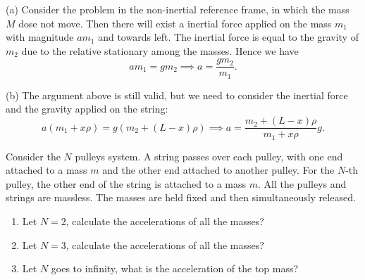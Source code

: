 \documentclass{article}
\begin{document}
\begin{solution}
	(a) Consider the problem in the non-inertial reference frame, in which the mass $M$ dose not move. Then there will exist a inertial force applied on the mass $m_1$ with magnitude $am_1$ and towards left. The inertial force is equal to the gravity of $m_2$ due to the relative stationary among the masses. Hence we have
	\[ am_1 = gm_2 \implies a = \frac{gm_2}{m_1}. \]

	(b) The argument above is still valid, but we need to consider the inertial force and the gravity applied on the string:
	\[ a(m_1+x\rho) = g(m_2 + (L-x)\rho) \implies a = \frac{m_2 + (L-x)\rho}{m_1 + x\rho} g. \]
\end{solution}



\begin{problem}
Consider the $N$ pulleys system. A string passes over each pulley, with one end attached to a mass $m$ and the other end attached to another pulley. For the $N$-th pulley, the other end of the string is attached to a mass $m$. All the pulleys and strings are massless. The masses are held fixed and then simultaneously released.

\begin{enumerate}
  \item[a)] Let $N=2$, calculate the accelerations of all the masses?
  \item[b)] Let $N=3$, calculate the accelerations of all the masses?
  \item[c)] Let $N$ goes to infinity, what is the acceleration of the top mass?
\end{enumerate}

\begin{center}
\end{center}
\end{problem}
\end{document}
